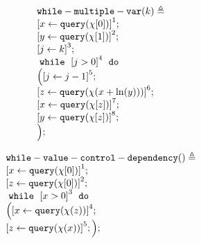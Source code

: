         \begin{example}
            \[
            \begin{array}{l}
            \kw{while-multiple-var}(k) \triangleq \\
                \clabel{ \assign{x}{\query(\chi[0])}}^{1} ; \\
                \clabel{ \assign{y}{\query(\chi[1])}}^{2} ; \\
                \clabel{\assign{j}{k} }^{3} ; \\
                    \ewhile ~ \clabel{j > 0}^{4} ~ \edo ~ \\
                    \Big(
                     \clabel{\assign{j}{j-1}}^{5} ;\\
                     \clabel{\assign{z}{\query(\chi(x + \ln(y)))} }^{6}  ; \\
                     \clabel{ \assign{x}{\query(\chi[z])}}^{7} ; \\
                     \clabel{ \assign{y}{\query(\chi[z])}}^{8} ; \\
                    \Big);
                \end{array}
            \]
            \end{example}
            \begin{example}
                \[
                \begin{array}{l}
                \kw{while-value-control-dependency}() \triangleq \\
                    \clabel{ \assign{x}{\query(\chi[0])} }^{1} ; \\
                    \clabel{ \assign{z}{\query(\chi[0])} }^{2} ; \\
                        \ewhile ~ \clabel{x > 0}^{3} ~ \edo ~ \\
                        \Big(
                        \clabel{\assign{x}{\query(\chi(z))} }^{4}  ; \\
                        \clabel{\assign{z}{\query(\chi(x))}}^{5} ;
                      \Big);
                    \end{array}
                \]
                \end{example}
%

